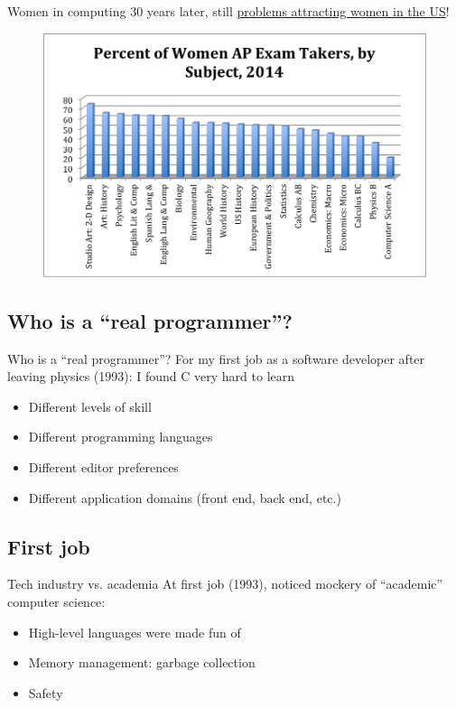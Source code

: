 \begin{frame}{Women in computing}
  30 years later, still \href{http://www.aauw.org/2015/03/11/is-computing-just-for-men/
}{problems attracting women in the US}!

  \begin{figure}
    \includegraphics[width=\textwidth]{Percent-women-taking-AP-science-exams.png}
  \end{figure}
\end{frame}

\subsection{Who is a ``real programmer''?}

\begin{frame}{Who is a ``real programmer''?}
  For my first job as a software developer after leaving physics
  (1993): I found C very hard to learn

  \begin{itemize}
  \item Different levels of skill
  \item Different programming languages
  \item Different editor preferences
  \item Different application domains (front end, back end, etc.)
  \end{itemize}
\end{frame}

\subsection{First job}

\begin{frame}{Tech industry vs. academia}
  At first job (1993), noticed mockery of ``academic'' computer
  science:

  \begin{itemize}
  \item High-level languages were made fun of
  \item Memory management: garbage collection
  \item Safety
  \end{itemize}
\end{frame}

